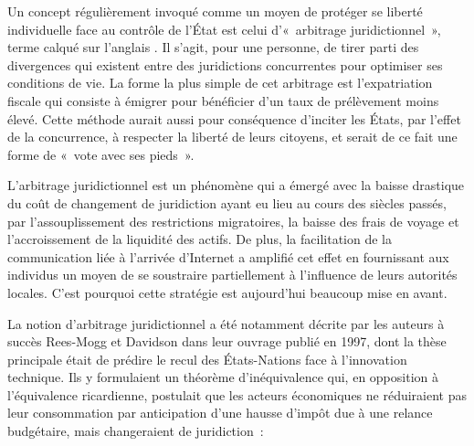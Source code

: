 Un concept régulièrement invoqué comme un moyen de protéger se liberté individuelle face au contrôle de l'État est celui d'«~arbitrage juridictionnel~», terme calqué sur l'anglais . Il s'agit, pour une personne, de tirer parti des divergences qui existent entre des juridictions concurrentes pour optimiser ses conditions de vie. La forme la plus simple de cet arbitrage est l'expatriation fiscale qui consiste à émigrer pour bénéficier d'un taux de prélèvement moins élevé. Cette méthode aurait aussi pour conséquence d'inciter les États, par l'effet de la concurrence, à respecter la liberté de leurs citoyens, et serait de ce fait une forme de «~vote avec ses pieds~».


L'arbitrage juridictionnel est un phénomène qui a émergé avec la baisse drastique du coût de changement de juridiction ayant eu lieu au cours des siècles passés, par l'assouplissement des restrictions migratoires, la baisse des frais de voyage et l'accroissement de la liquidité des actifs. De plus, la facilitation de la communication liée à l'arrivée d'Internet a amplifié cet effet en fournissant aux individus un moyen de se soustraire partiellement à l'influence de leurs autorités locales. C'est pourquoi cette stratégie est aujourd'hui beaucoup mise en avant. %

La notion d'arbitrage juridictionnel a été notamment décrite par les auteurs à succès Rees-Mogg et Davidson dans leur ouvrage  publié en 1997, dont la thèse principale était de prédire le recul des États-Nations face à l'innovation technique. Ils y formulaient un théorème d'inéquivalence qui, en opposition à l'équivalence ricardienne, postulait que les acteurs économiques ne réduiraient pas leur consommation par anticipation d'une hausse d'impôt due à une relance budgétaire, mais changeraient de juridiction~:

